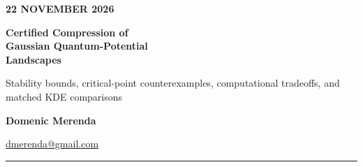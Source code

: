 \documentclass[10pt,a4paper]{article}
\begin{document}
\vspace*{5mm}
{\sffamily\footnotesize\bfseries\color{accent} 22 NOVEMBER 2026}\par
\vspace{7mm}
{\sffamily\fontsize{23}{28}\selectfont\bfseries\color{ink} Certified Compression of\\ Gaussian Quantum-Potential\\ Landscapes}\par
\vspace{3mm}
{\sffamily\large\color{muted} Stability bounds, critical-point counterexamples, computational tradeoffs, and matched KDE comparisons}\par
\vspace{3mm}
{\sffamily\normalsize\bfseries\color{ink} Domenic Merenda}\par
{\sffamily\normalsize\color{accent}\href{mailto:dmerenda@gmail.com}{dmerenda@gmail.com}}\par
\vspace{4mm}
\noindent\color{accent}\rule{\linewidth}{1.1pt}\color{ink}
\vspace{4mm}
\begin{abstract}
\noindent\textbf{Question.} Can low-cardinality summaries of Gaussian quantum-clustering potentials preserve and certify critical-point structure at lower computational cost, and does the extra potential topology provide downstream statistical value?\\
\textbf{Approach.} We derive group-moment Taylor enclosures, couple them to interval/Krawczyk critical-point tests, examine near-bifurcation failures, benchmark full and compressed verification, and compare quantum-potential separation detection with bandwidth-tuned kernel density estimation (KDE).\\
\textbf{Results.} Small two-dimensional reference potentials can be verified from compressed summaries. On a favorable fixed two-well family, two summaries supported verification through 2,048 original anchors with approximately constant observed verification time. But certification was inconclusive on overlapping, anisotropic and near-degenerate inputs, and paired 32-anchor end-to-end time improved only modestly (17.945 s direct; 16.238 s compressed). In a held-out synthetic split-detection study, tuned KDE detected 98.75\% of alternatives versus 75.0\% for QC at a shared 1.875\% false-split rate.\\
\textbf{Conclusion.} The results support an instructive numerical technique and useful counterexamples; they do \emph{not} establish a general new topology-preserving coreset theorem, consistent computational superiority, or a unique machine-learning advantage.
\end{abstract}
\vspace{2mm}
\end{document}
